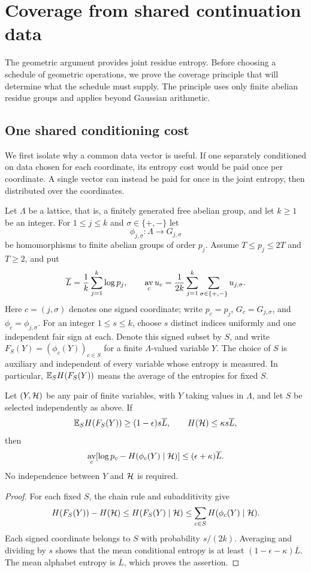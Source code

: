 \section{Coverage from shared continuation data}\label{sec:transfer}
The geometric argument provides joint residue entropy. Before choosing a
schedule of geometric operations, we prove the coverage principle that
will determine what the schedule must supply. The principle uses only
finite abelian residue groups and applies beyond Gaussian arithmetic.

\subsection{One shared conditioning cost}\label{sec:entropy}
We first isolate why a common data vector is useful. If one separately
conditioned on data chosen for each coordinate, its entropy cost would
be paid once per coordinate. A single vector can instead be paid for
once in the joint entropy, then distributed over the coordinates.

Let $\Lambda$ be a lattice, that is, a finitely generated free abelian
group, and let $k\ge1$ be an integer. For $1\le j\le k$ and
$\sigma\in\{+,-\}$ let
\[
 \phi_{j,\sigma}:\Lambda\longrightarrow G_{j,\sigma}
\]
be homomorphisms to finite abelian groups of order $p_j$.
Assume $T\le p_j\le2T$ and $T\ge2$, and put
\[
 \overline L=\frac1k\sum_{j=1}^k\log p_j,\qquad
 \mathop{\mathrm{av}}_c u_c=\frac1{2k}\sum_{j=1}^k\sum_{\sigma\in\{+,-\}}u_{j,\sigma}.
\]
Here $c=(j,\sigma)$ denotes one signed coordinate; write
$p_c=p_j$, $G_c=G_{j,\sigma}$, and $\phi_c=\phi_{j,\sigma}$.
For an integer $1\le s\le k$, choose $s$ distinct indices uniformly and one
independent fair sign at each. Denote this signed subset by $S$, and
write $F_S(Y)=(\phi_c(Y))_{c\in S}$ for a finite $\Lambda$-valued
variable $Y$. The choice of $S$ is auxiliary and independent of every
variable whose entropy is measured. In particular,
$\mathbb E_S H(F_S(Y))$ means the average of the entropies for fixed $S$.

\begin{lemma}\label{lem:conditioning}
Let $(Y,\mathcal H)$ be any pair of finite variables, with $Y$ taking values
in $\Lambda$, and let $S$ be selected independently as above. If
\[
 \mathbb E_S H(F_S(Y))\ge(1-\epsilon)s\overline L,
 \qquad H(\mathcal H)\le\kappa s\overline L,
\]
then
\begin{equation}\label{eq:deficit-upper}
 \mathop{\mathrm{av}}_c[\log p_c-H(\phi_c(Y)\mid\mathcal H)]
 \le(\epsilon+\kappa)\overline L.
\end{equation}
No independence between $Y$ and $\mathcal H$ is required.
\end{lemma}
\begin{proof}
For each fixed $S$, the chain rule and subadditivity give
\[
 H(F_S(Y))-H(\mathcal H)
 \le H(F_S(Y)\mid\mathcal H)
 \le\sum_{c\in S}H(\phi_c(Y)\mid\mathcal H).
\]
Each signed coordinate belongs to $S$ with probability $s/(2k)$.
Averaging and dividing by $s$ shows that the mean conditional entropy
is at least $(1-\epsilon-\kappa)\overline L$. The mean alphabet entropy
is $\overline L$, which proves the assertion.
\end{proof}

